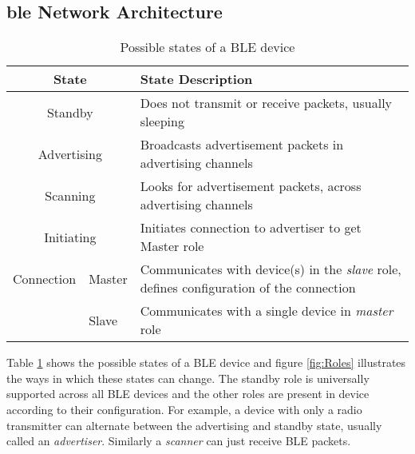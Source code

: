 \subsection[\texorpdfstring{\gls{ble}}{BLE} Network Architecture]{\texorpdfstring{\gls{ble}}{BLE} Network Architecture\cite{BLE101}}

\begin{table}[htbp]
\begin{center}
\vspace{-10pt}
\setlength{\extrarowheight}{1.5pt}
\begin{tabular}{|m{2.5cm}|m{1.2cm}|m{11.4cm}|}
\hline
\multicolumn{ 2}{|c|}{\textbf{State}} & \textbf{State Description} \\ \hline
\multicolumn{ 2}{|c|}{Standby} & Does not transmit or receive packets, usually sleeping \\ \hline
\multicolumn{ 2}{|c|}{Advertising} & Broadcasts advertisement packets in  advertising channels \\ \hline
\multicolumn{ 2}{|c|}{Scanning} & Looks for advertisement packets, across advertising channels \\ \hline
\multicolumn{ 2}{|c|}{Initiating} & Initiates connection to advertiser to get Master role \\ \hline
\multicolumn{ 1}{|m{2.0cm}|}{\hspace{42pt} \mbox{Connection}} & Master & Communicates with device(s) in the \emph{slave} role, defines configuration of the connection \\ \cline{ 2- 3}
\multicolumn{ 1}{|l|}{} & Slave & Communicates with a single device in \emph{master} role \\ \hline
\end{tabular}
\end{center}
\vspace{-12pt}
\caption{Possible states of a BLE device}
\vspace{-6pt}
\label{tbl:BLEstates}
\end{table}

Table \ref{tbl:BLEstates} shows the possible states of a BLE device and figure \ref{fig:Roles} illustrates the ways in which these states can change. The standby role is universally supported across all BLE devices and the other roles are present in device according to their configuration. For example, a device with only a radio transmitter can alternate between the advertising and standby state, usually called an \emph{advertiser}. Similarly a \emph{scanner} can just receive BLE packets.

